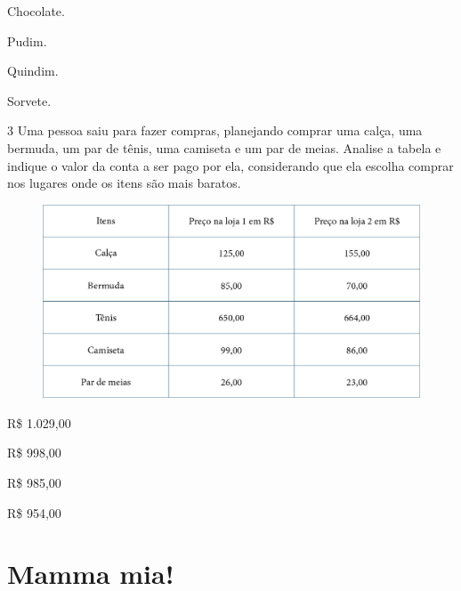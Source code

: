 \begin{escolha}[itemsep=-5pt]
\item Chocolate.

\item Pudim.

\item Quindim.

\item Sorvete.
\end{escolha}

\pagebreak
\num{3} Uma pessoa saiu para fazer compras, planejando comprar uma calça, uma bermuda, um par de tênis, uma camiseta e um par de meias. Analise a tabela e indique o valor da conta a ser pago por ela, considerando que ela escolha comprar nos lugares onde os
itens são mais baratos.

\begin{figure}[htpb!]
\includegraphics[width=\textwidth]{./media/image102.png}
\end{figure}

\begin{escolha}[itemsep=-5pt]
\item R\$ 1.029,00

\item R\$ 998,00

\item R\$ 985,00

\item R\$ 954,00
\end{escolha}

\chapter{Mamma mia!}

\vspace*{-1.5cm}

